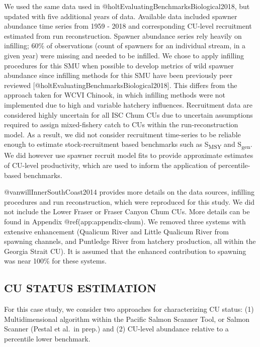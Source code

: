\documentclass[
]{article}
\begin{document}
We used the same data used in @holtEvaluatingBenchmarksBiological2018,
but updated with five additional years of data. Available data included
spawner abundance time series from 1959 - 2018 and corresponding
CU-level recruitment estimated from run reconstruction. Spawner
abundance series rely heavily on infilling; 60\% of observations (count
of spawners for an individual stream, in a given year) were missing and
needed to be infilled. We chose to apply infilling procedures for this
SMU when possible to develop metrics of wild spawner abundance since
infilling methods for this SMU have been previously peer reviewed
{[}@holtEvaluatingBenchmarksBiological2018{]}. This differs from the
approach taken for WCVI Chinook, in which infilling methods were not
implemented due to high and variable hatchery influences. Recruitment
data are considered highly uncertain for all ISC Chum CUs due to
uncertain assumptions required to assign mixed-fishery catch to CUs
within the run-reconstruction model. As a result, we did not consider
recruitment time-series to be reliable enough to estimate
stock-recruitment based benchmarks such as S\textsubscript{MSY} and
S\textsubscript{gen}. We did however use spawner recruit model fits to
provide approximate estimates of CU-level productivity, which are used
to inform the application of percentile-based benchmarks.

@vanwillInnerSouthCoast2014 provides more details on the data sources,
infilling procedures and run reconstruction, which were reproduced for
this study. We did not include the Lower Fraser or Fraser Canyon Chum
CUs. More details can be found in Appendix @ref(app:appendix-chum). We
removed three systems with extensive enhancement (Qualicum River and
Little Qualicum River from spawning channels, and Puntledge River from
hatchery production, all within the Georgia Strait CU). It is assumed
that the enhanced contribution to spawning was near 100\% for these
systems.

\hypertarget{cu-status-estimation}{%
\subsection{CU STATUS ESTIMATION}\label{cu-status-estimation}}

For this case study, we consider two approaches for characterizing CU
status: (1) Multidimensional algorithm within the Pacific Salmon Scanner
Tool, or Salmon Scanner (Pestal et al.~in prep.) and (2) CU-level
abundance relative to a percentile lower benchmark.
\end{document}
